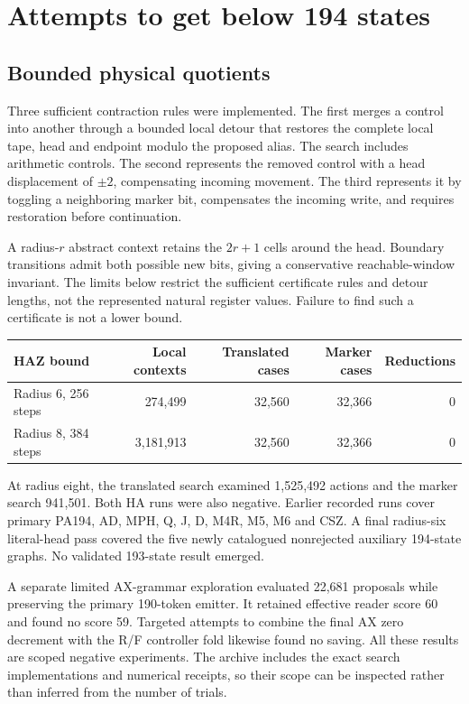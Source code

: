 \documentclass[11pt]{article}
\begin{document}
\section{Attempts to get below 194 states}

\subsection{Bounded physical quotients}

Three sufficient contraction rules were implemented. The first merges a
control into another through a bounded local detour that restores the
complete local tape, head and endpoint modulo the proposed alias. The
search includes arithmetic controls. The second represents the removed
control with a head displacement of $\pm2$, compensating incoming movement.
The third represents it by toggling a neighboring marker bit, compensates
the incoming write, and requires restoration before continuation.

A radius-$r$ abstract context retains the $2r+1$ cells around the head.
Boundary transitions admit both possible new bits, giving a conservative
reachable-window invariant. The limits below restrict the sufficient
certificate rules and detour lengths, not the represented natural
register values. Failure to find such a certificate is not a lower bound.

\begin{center}\small
\begin{tabular}{lrrrr}
\toprule
HAZ bound & Local contexts & Translated cases & Marker cases & Reductions\\
\midrule
Radius 6, 256 steps & 274,499 & 32,560 & 32,366 & 0\\
Radius 8, 384 steps & 3,181,913 & 32,560 & 32,366 & 0\\
\bottomrule
\end{tabular}
\end{center}
At radius eight, the translated search examined 1,525,492 actions and the
marker search 941,501. Both HA runs were also negative. Earlier recorded
runs cover primary PA194, AD, MPH, Q, J, D, M4R, M5, M6 and CSZ. A final
radius-six literal-head pass covered the five newly catalogued nonrejected
auxiliary 194-state graphs. No validated 193-state result emerged.

A separate limited AX-grammar exploration evaluated 22,681 proposals while
preserving the primary 190-token emitter. It retained effective reader
score 60 and found no score 59. Targeted attempts to combine the final AX
zero decrement with the R/F controller fold likewise found no saving.
All these results are scoped negative experiments. The archive includes
the exact search implementations and numerical receipts, so their scope
can be inspected rather than inferred from the number of trials.
\end{document}
